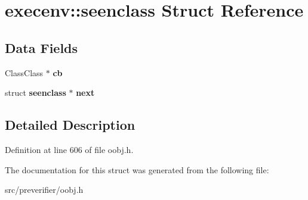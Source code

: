 \section{execenv::seenclass Struct Reference}
\label{structexecenv_1_1seenclass}
\subsection*{Data Fields}
\begin{DoxyCompactItemize}
\item 
ClassClass $\ast$ {\bfseries cb}\label{structexecenv_1_1seenclass_aaefe8c736fd470f68ab48e6cb73ccebf}

\item 
struct {\bf seenclass} $\ast$ {\bfseries next}\label{structexecenv_1_1seenclass_af4b5288ebd71fae41febf739eb2e9443}

\end{DoxyCompactItemize}


\subsection{Detailed Description}


Definition at line 606 of file oobj.h.



The documentation for this struct was generated from the following file:\begin{DoxyCompactItemize}
\item 
src/preverifier/oobj.h\end{DoxyCompactItemize}
